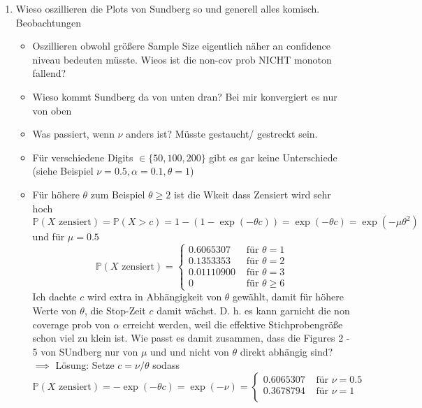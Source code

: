 \begin{enumerate}
\begin{verbatim}
		tab_sim <- sapply(p_f_vals, function(p) {
			sapply(E_r_vals, function(E) {
				n <- round(E / p)
				r <- rbinom(M, size = n, prob = p)     # Anzahl Ausfälle pro Simulation
				sum(r <= 1)
			})
		})
	\end{verbatim}
	\item 
	Wieso oszillieren die Plots von Sundberg so und generell alles komisch. Beobachtungen
	\begin{itemize}
		\item
		Oszillieren obwohl größere Sample Size eigentlich näher an confidence niveau bedeuten müsste. Wieos ist die non-cov prob NICHT monoton fallend?
		\item
		Wieso kommt Sundberg da von unten dran? Bei mir konvergiert es nur von oben
		\item 
		Was passiert, wenn $\nu$ anders ist? Müsste gestaucht/ gestreckt sein.
		\item 
		Für verschiedene Digits $\in \{50, 100, 200\}$ gibt es gar keine Unterschiede (siehe Beispiel $\nu = 0.5, \alpha = 0.1, \theta = 1$)
		\item 
		Für höhere $\theta$ zum Beispiel $\theta \geq 2$ ist die Wkeit dass Zensiert wird sehr hoch
		\[
		\mathbb{P}(X \text{ zensiert}) 
		=
		\mathbb{P} \left( X > c \right)
		=
		1 - \left( 1 - \exp(-\theta c) \right)
		=
		\exp(- \theta c) 
		=
		\exp(- \mu \theta^2)
		\]
		und für $\mu = 0.5$
		\[
		\mathbb{P}(X \text{ zensiert}) = 
		\begin{cases}
			0.6065307 &\text{ für } \theta = 1 \\
			0.1353353 &\text{ für } \theta = 2 \\
			0.01110900 &\text{ für } \theta = 3 \\
			0 &\text{ für } \theta \geq 6
		\end{cases}
		\]
		Ich dachte $c$ wird extra in Abhängigkeit von $\theta$ gewählt, damit für höhere Werte von $\theta$, die Stop-Zeit $c$ damit wächst. 
		D. h. es kann garnicht die non coverage prob von $\alpha$ erreicht werden, weil die effektive Stichprobengröße schon viel zu klein ist. 
		Wie passt es damit zusammen, dass die Figures 2 - 5 von SUndberg nur von $\mu$ und und nicht von $\theta$ direkt abhängig sind? \\
		$\implies$ Lösung: Setze $c = \nu / \theta$ sodass
		\[
		\mathbb{P}(X \text{ zensiert}) 
		=
		- \exp(-\theta c) 
		=
		\exp(- \nu) 
		=
		\begin{cases}
			0.6065307 & \text{ für } \nu = 0.5 \\
			0.3678794 & \text{ für } \nu = 1 \\ 

\end{cases}\]
\end{itemize}
\end{enumerate}
